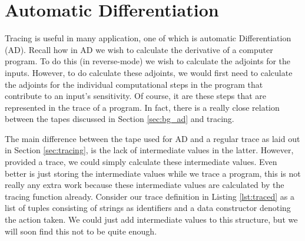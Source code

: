 \section{Automatic Differentiation} \label{sec:ad}
    Tracing is useful in many application, one of which is automatic Differentiation (AD).
    Recall how in AD we wish to calculate the derivative of a computer program.
    To do this (in reverse-mode) we wish to calculate the adjoints for the inputs.
    However, to do calculate these adjoints, we would first need to calculate the adjoints for the individual computational steps in the program that contribute to an input's sensitivity.
    Of course, it are these steps that are represented in the trace of a program.
    In fact, there is a really close relation between the tapes discussed in Section \ref{sec:bg_ad} and tracing.

    The main difference between the tape used for AD and a regular trace as laid out in Section \ref{sec:tracing}, is the lack of intermediate values in the latter.
    However, provided a trace, we could simply calculate these intermediate values.
    Even better is just storing the intermediate values while we trace a program, this is not really any extra work because these intermediate values are calculated by the tracing function already.
    Consider our trace definition in Listing \ref{lst:traced} as a list of tuples consisting of strings as identifiers and a data constructor denoting the action taken.
    We could just add intermediate values to this structure, but we will soon find this not to be quite enough.
    

